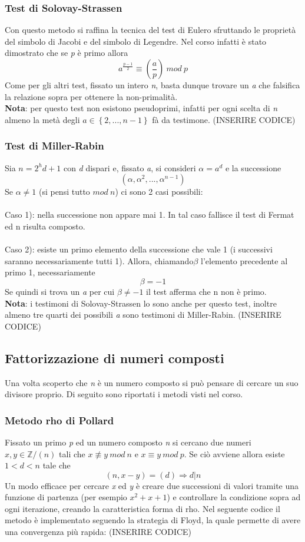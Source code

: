 \documentclass{article}
\begin{document}
\subsubsection{Test di Solovay-Strassen}
Con questo metodo si raffina la tecnica del test di Eulero sfruttando le proprietà del simbolo di Jacobi e del simbolo di Legendre. Nel corso infatti è stato dimostrato che se \textit{p} è primo allora \[a^{\frac{p-1}{2}}\equiv \left(\frac{a}{p}\right)\ mod\ p\]
Come per gli altri test, fissato un intero \textit{n}, basta dunque trovare un \textit{a} che falsifica la relazione sopra per ottenere la non-primalità.\\
\textbf{Nota}: per questo test non esistono pseudoprimi, infatti per ogni scelta di \textit{n} almeno la metà degli \(a\in\left\{2,...,n-1\right\}\) fà da testimone. (INSERIRE CODICE)\\
\subsubsection{Test di Miller-Rabin}
Sia \(n=2^hd+1\) con \textit{d} dispari e, fissato \textit{a}, si consideri \(\alpha=a^d\) e la successione 
\[(\alpha,\alpha^2,...,\alpha^{n-1})\]
Se \(\alpha\not= 1\) (si pensi tutto \(mod\ n\)) ci sono 2 casi possibili:\\ \\ Caso 1): nella successione non appare mai 1. In tal caso fallisce il test di Fermat ed n risulta composto.\\ \\ Caso 2): esiste un primo elemento della successione che vale 1 (i successivi saranno necessariamente tutti 1). Allora, chiamando\(\beta\) l'elemento precedente al primo 1, necessariamente \[\beta=-1\]
Se quindi si trova un \textit{a} per cui \(\beta\not= -1\) il test afferma che n non è primo.\\\textbf{Nota}: i testimoni di Solovay-Strassen lo sono anche per questo test, inoltre almeno tre quarti dei possibili \textit{a} sono testimoni di Miller-Rabin. (INSERIRE CODICE)\\
\subsection{Fattorizzazione di numeri composti}
Una volta scoperto che \textit{n} è un numero composto si può pensare di cercare un suo divisore proprio. Di seguito sono riportati i metodi visti nel corso.
\subsubsection{Metodo rho di Pollard}
Fissato un primo \textit{p} ed un numero composto \textit{n} si cercano due numeri \(x,y\in\mathbb{Z}/(n)\) tali che \(x\not\equiv y\ mod\ n\) e \(x\equiv y\ mod\ p\). Se ciò avviene allora esiste \(1<d<n\) tale che \[(n,x-y)=(d)\Rightarrow d|n\]
Un modo efficace per cercare \textit{x} ed \textit{y} è creare due successioni di valori tramite una funzione di partenza (per esempio \(x^2+x+1\)) e controllare la condizione sopra ad ogni iterazione, creando la caratteristica forma di rho. Nel seguente codice il metodo è implementato seguendo la strategia di Floyd, la quale permette di avere una convergenza più rapida: (INSERIRE CODICE)\\
\end{document}
